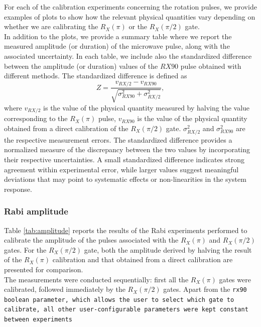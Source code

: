For each of the calibration experiments concerning the rotation pulses, we provide examples of plots to show how the relevant physical quantities vary depending on whether we are calibrating the $R_X(\pi)$ or the $R_X(\pi/2)$ gate.\\
In addition to the plots, we provide a summary table where we report the measured amplitude (or duration) of the microwave pulse, along with the associated uncertainty.
In each table, we include also the standardized difference between the amplitude (or duration) values of the $RX90$ pulse obtained with different methods.
The standardized difference is defined as
\begin{equation}\label{eq:std_difference}
    Z = \frac{v_{RX/2}-v_{RX90}}{\sqrt{\sigma^2_{RX90} + \sigma^2_{RX/2}}},
\end{equation}
where $v_{RX/2}$ is the value of the physical quantity measured by halving the value corresponding to the $R_X(\pi)$ pulse, $v_{RX90}$ is the value of the physical quantity obtained from a direct calibration of the $R_X(\pi/2)$ gate.
$\sigma^2_{RX/2}$ and $\sigma^2_{RX90}$ are the respective measurement errors.
The standardized difference provides a normalized measure of the discrepancy between the two values by incorporating their respective uncertainties. 
A small standardized difference indicates strong agreement within experimental error, while larger values suggest meaningful deviations that may point to systematic effects or non-linearities in the system response.

\subsubsection{Rabi amplitude}
Table \ref{tab:amplitude} reports the results of the Rabi experiments performed to calibrate the amplitude of the pulses associated with the $R_X(\pi)$ and $R_X(\pi/2)$ gates.
For the $R_X(\pi/2)$ gate, both the amplitude derived by halving the result of the $R_X(\pi)$ calibration and that obtained from a direct calibration are presented for comparison.\\
The measurements were conducted sequentially: first all the $R_X(\pi)$ gates were calibrated, followed immediately by the $R_X(\pi/2)$ gates. 
Apart from the \tt{rx90} boolean parameter, which allows the user to select which gate to calibrate, all other user-configurable parameters were kept constant between experiments
